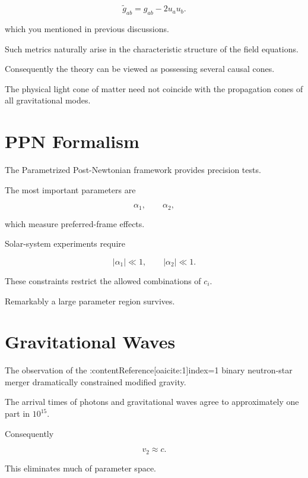 \begin{equation}
\tilde g_{ab}
=
g_{ab}
-
2u_a u_b .
\end{equation}

which you mentioned in previous discussions.

Such metrics naturally arise in the characteristic structure of the
field equations.

Consequently the theory can be viewed as possessing several causal cones.

The physical light cone of matter need not coincide with
the propagation cones of all gravitational modes.

\section{PPN Formalism}

The Parametrized Post-Newtonian framework provides precision tests.

The most important parameters are

\begin{equation}
\alpha_1,
\qquad
\alpha_2,
\end{equation}

which measure preferred-frame effects.

Solar-system experiments require

\begin{equation}
|\alpha_1|
\ll 1,
\qquad
|\alpha_2|
\ll 1.
\end{equation}

These constraints restrict the allowed combinations of
$c_i$.

Remarkably a large parameter region survives.

\section{Gravitational Waves}

The observation of the
:contentReference[oaicite:1]{index=1}
binary neutron-star merger dramatically constrained modified gravity.

The arrival times of photons and gravitational waves agree to
approximately one part in $10^{15}$.

Consequently

\begin{equation}
v_2 \approx c.
\end{equation}

This eliminates much of parameter space.

